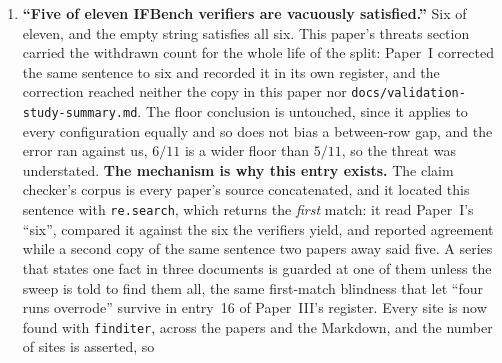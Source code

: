 \documentclass[11pt]{article}
\begin{document}
\begin{enumerate}
    seven runs carry all four arms, and six of them recorded a real optimizer search on arms
    \textbf{B} and \textbf{D} in the same invocation; this paper reads arm~\textbf{A} out of that
    shared artifact rather than having commissioned an arm-\textbf{A}-only run. No reported number
    moves, and the reason is the same one that makes the claim recoverable: arm~\textbf{A} declares
    no evolvable genes, so a search on its siblings cannot reach it, and its two scores are
    identical on every seed of all $242$ arm-\textbf{A} seed entries in the release. So the
    conclusion stood on a false warrant. The paragraph now states the invariant instead of the
    invocation, which has the additional merit of being checkable: a claim about how a command was
    typed leaves no trace in the artifact, and \texttt{verify\_paper\_claims.py} now asserts the
    inertness directly. Registered because ``no optimizer anywhere'' is the premise the whole paper
    is built to license, and a premise supported by an unverifiable procedural claim is weaker than
    one supported by a property of the released data, even when both happen to yield the same
    results.
  \item \textbf{``Five of eleven IFBench verifiers are vacuously satisfied.''} Six of eleven, and
    the empty string satisfies all six. This paper's threats section carried the withdrawn count
    for the whole life of the split: Paper~I corrected the same sentence to six and recorded it in
    its own register, and the correction reached neither the copy in this paper nor
    \texttt{docs/validation-study-summary.md}. The floor conclusion is untouched, since it applies
    to every configuration equally and so does not bias a between-row gap, and the error ran
    against us, $6/11$ is a wider floor than $5/11$, so the threat was understated.
    \textbf{The mechanism is why this entry exists.} The claim checker's corpus is every paper's
    source concatenated, and it located this sentence with \texttt{re.search}, which returns the
    \emph{first} match: it read Paper~I's ``six'', compared it against the six the verifiers
    yield, and reported agreement while a second copy of the same sentence two papers
    away said five. A series that states one fact in three documents is guarded at one of them
    unless the sweep is told to find them all, the same first-match blindness that let ``four
    runs overrode'' survive in entry~16 of Paper~III's register. Every site is now found with
    \texttt{finditer}, across the papers and the Markdown, and the number of sites is asserted, so

\end{enumerate}
\end{document}
